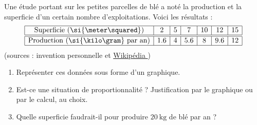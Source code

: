 
\begin{exercice}\label{exo2smath-0036}

    Une étude portant sur les petites parcelles de blé a noté la production et la superficie d'un certain nombre d'exploitations. Voici les résultats :
    \begin{equation*}
        \begin{array}[]{|c|c|c|c| c |c|c|}
            \hline
            \text{Superficie (\si{\meter\squared})}&2&5      &  7       &  10   &  12  & 15 \\
              \hline\hline
              \text{Production (\si{\kilo\gram} par an)}&1.6&4      &  5.6     &  8     &  9.6& 12 \\ 
              \hline 
               \end{array}
    \end{equation*}
    (sources : invention personnelle et \href{ http://fr.wikipedia.org/wiki/Rendement_agricole }{ Wikipédia })
    \begin{enumerate}
        \item
            Représenter ces données sous forme d'un graphique.
        \item
            Est-ce une situation de proportionnalité ? Justification par le graphique ou par le calcul, au choix.
        \item
            Quelle superficie faudrait-il pour produire \( \SI{20}{\kilo\gram}\) de blé par an ?
    \end{enumerate}

\end{exercice}
